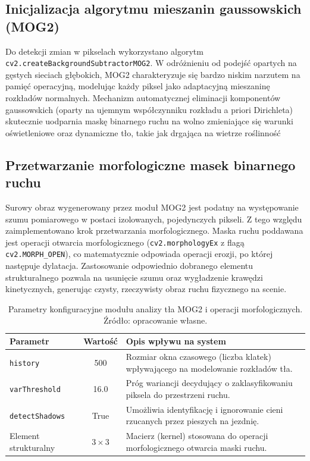 \subsection{Inicjalizacja algorytmu mieszanin gaussowskich (MOG2)}

Do detekcji zmian w pikselach wykorzystano algorytm \texttt{cv2.createBackgroundSubtractorMOG2}. W
odróżnieniu od podejść opartych na gęstych sieciach głębokich, MOG2 charakteryzuje się bardzo
niskim narzutem na pamięć operacyjną, modelując każdy piksel jako adaptacyjną mieszaninę rozkładów
normalnych. Mechanizm automatycznej eliminacji komponentów gaussowskich (oparty na ujemnym
współczynniku rozkładu a priori Dirichleta) skutecznie uodparnia maskę binarnego ruchu na wolno
zmieniające się warunki oświetleniowe oraz dynamiczne tło, takie jak drgająca na wietrze roślinność

\subsection{Przetwarzanie morfologiczne masek binarnego ruchu}

Surowy obraz wygenerowany przez moduł MOG2 jest podatny na występowanie szumu pomiarowego w postaci
izolowanych, pojedynczych pikseli. Z tego względu zaimplementowano krok przetwarzania
morfologicznego. Maska ruchu poddawana jest operacji otwarcia morfologicznego
(\texttt{cv2.morphologyEx} z flagą \texttt{cv2.MORPH\_OPEN}), co matematycznie odpowiada operacji
erozji, po której następuje dylatacja. Zastosowanie odpowiednio dobranego elementu strukturalnego
pozwala na usunięcie szumu oraz wygładzenie krawędzi kinetycznych, generując czysty, rzeczywisty
obraz ruchu fizycznego na scenie.

\begin{table}[htbp]
  \centering
  \caption{Parametry konfiguracyjne modułu analizy tła MOG2 i operacji morfologicznych. Źródło: opracowanie własne.}
  \label{tab:params_mog2}
  \renewcommand{\arraystretch}{1.3}
  \begin{tabular}{|l|c|p{8cm}|}
    \hline
    \textbf{Parametr}      & \textbf{Wartość} & \textbf{Opis wpływu na system}                                                    \\ \hline
    \texttt{history}       & 500              & Rozmiar okna czasowego (liczba klatek) wpływającego na modelowanie rozkładów tła. \\ \hline
    \texttt{varThreshold}  & 16.0             & Próg wariancji decydujący o zaklasyfikowaniu piksela do przestrzeni ruchu.        \\ \hline
    \texttt{detectShadows} & True             & Umożliwia identyfikację i ignorowanie cieni rzucanych przez pieszych na jezdnię.  \\ \hline
    Element strukturalny   & $3 \times 3$     & Macierz (kernel) stosowana do operacji morfologicznego otwarcia maski ruchu.      \\ \hline
  \end{tabular}
\end{table}

